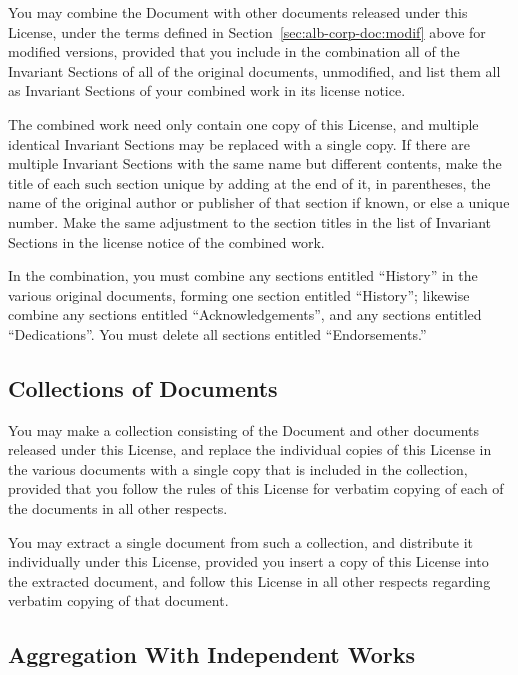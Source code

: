 \documentclass[11pt,a4paper,oneside]{article}
\begin{document}
\begin{albTitlePage}
You may combine the Document with other documents released under this
License, under the terms defined in Section~\ref{sec:alb-corp-doc:modif}
above for modified versions, provided that you include in the
combination all of the Invariant Sections of all of the original
documents, unmodified, and list them all as Invariant Sections of your
combined work in its license notice.

The combined work need only contain one copy of this License, and
multiple identical Invariant Sections may be replaced with a single
copy.  If there are multiple Invariant Sections with the same name but
different contents, make the title of each such section unique by adding
at the end of it, in parentheses, the name of the original author or
publisher of that section if known, or else a unique number.  Make the
same adjustment to the section titles in the list of Invariant Sections
in the license notice of the combined work.

In the combination, you must combine any sections entitled ``History''
in the various original documents, forming one section entitled
``History''; likewise combine any sections entitled
``Acknowledgements'', and any sections entitled ``Dedications''.  You
must delete all sections entitled ``Endorsements.''


\subsection{Collections of Documents}
\label{sec:alb-corp-doc:coll-docum}

You may make a collection consisting of the Document and other documents
released under this License, and replace the individual copies of this
License in the various documents with a single copy that is included in
the collection, provided that you follow the rules of this License for
verbatim copying of each of the documents in all other respects.

You may extract a single document from such a collection, and distribute
it individually under this License, provided you insert a copy of this
License into the extracted document, and follow this License in all
other respects regarding verbatim copying of that document.


\subsection{Aggregation With Independent Works}
\label{sec:alb-corp-doc:aggr-with-indep-works}


\end{albTitlePage}
\end{document}
